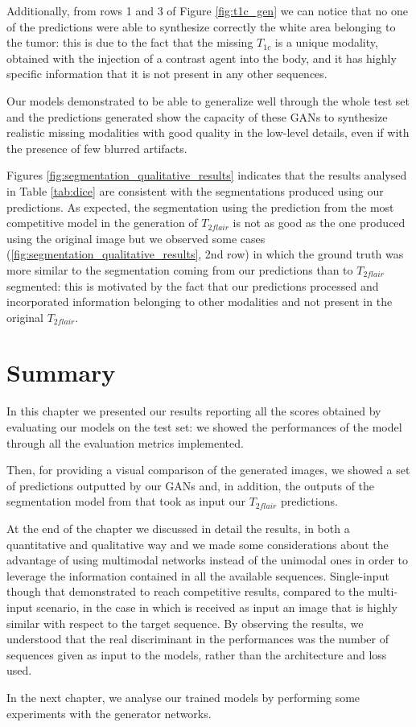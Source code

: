\vspace{5mm} %
Additionally, from rows 1 and 3 of Figure \ref{fig:t1c_gen} we can notice that no one of the predictions were able to synthesize correctly the white area belonging to the tumor: this is due to the fact that the missing $T_{1c}$ is a unique modality, obtained with the injection of a contrast agent into the body, and it has highly specific information that it is not present in any other sequences. 

\vspace{5mm} %
Our models demonstrated to be able to generalize well through the whole test set and the predictions generated show the capacity of these \ac{GAN}s to synthesize realistic missing modalities with good quality in the low-level details, even if with the presence of few blurred artifacts.

\vspace{5mm} %
Figures \ref{fig:segmentation_qualitative_results} indicates that the results analysed in Table \ref{tab:dice} are consistent with the segmentations produced using our predictions. As expected, the segmentation using the prediction from the most competitive model in the generation of $T_{2flair}$ is not as good as the one produced using the original image but we observed some cases (\ref{fig:segmentation_qualitative_results}, 2nd row) in which the ground truth was more similar to the segmentation coming from our predictions than to $T_{2flair}$ segmented: this is motivated by the fact that our predictions processed and incorporated information belonging to other modalities and not present in the original $T_{2flair}$.

\section{Summary}
\label{sec:5th_section_summary}
In this chapter we presented our results reporting all the scores obtained by evaluating our models on the test set: we showed the performances of the model through all the evaluation metrics implemented.

Then, for providing a visual comparison of the generated images, we showed a set of predictions outputted by our \ac{GAN}s and, in addition,  the outputs of the segmentation model from \cite{giacomello2019brain} that took as input our $T_{2flair}$ predictions.

At the end of the chapter we discussed in detail the results, in both a quantitative and qualitative way and we made some considerations about the advantage of using multimodal networks instead of the unimodal ones in order to leverage the information contained in all the available sequences. Single-input though that demonstrated to reach competitive results, compared to the multi-input scenario, in the case in which is received as input an image that is highly similar with respect to the target sequence. By observing the results, we understood that the real discriminant in the performances was the number of sequences given as input to the models, rather than the architecture and loss used.

In the next chapter, we analyse our trained models by performing some experiments with the generator networks.